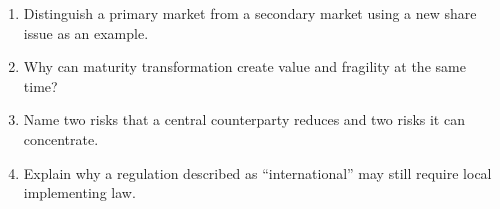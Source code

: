 \begin{exerciseblock}
\begin{enumerate}
  \item Distinguish a primary market from a secondary market using a new share issue as an example.
  \item Why can maturity transformation create value and fragility at the same time?
  \item Name two risks that a central counterparty reduces and two risks it can concentrate.
  \item Explain why a regulation described as ``international'' may still require local implementing law.
\end{enumerate}
\end{exerciseblock}

